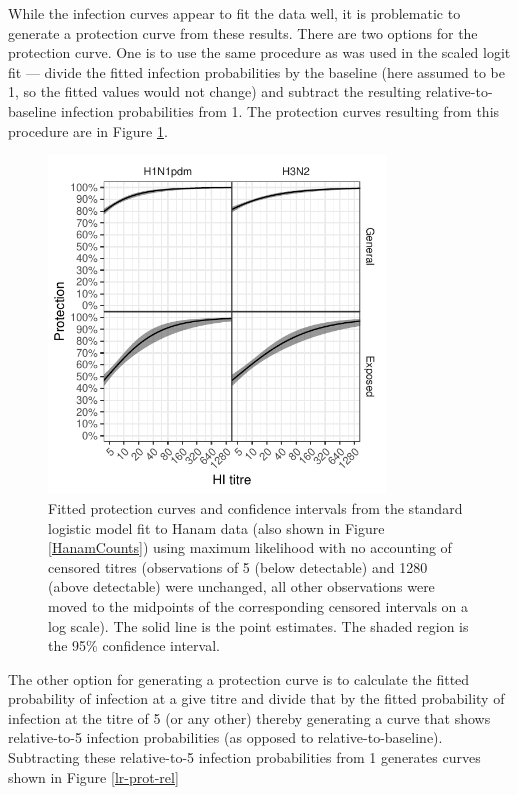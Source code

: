 \documentclass[12pt]{article}
\begin{document}
\pagebreak

While the infection curves appear to fit the data well, it is problematic to generate a protection curve from these results. There are two options for the protection curve. One is to use the same procedure as was used in the scaled logit fit --- divide the fitted infection probabilities by the baseline (here assumed to be 1, so the fitted values would not change) and subtract the resulting relative-to-baseline infection probabilities from 1. The protection curves resulting from this procedure are in Figure \ref{lr-prot-abs}.

\begin{figure}[htp]
	\centering
	\includegraphics[width=0.8\textwidth]{../fit-logistic-plot/hanam-hi-prot.pdf}
	\caption{
	Fitted protection curves and confidence intervals from the standard logistic model fit to Hanam data (also shown in Figure \ref{HanamCounts}) using maximum likelihood with no accounting of censored titres (observations of 5 (below detectable) and 1280 (above detectable) were unchanged, all other observations were moved to the midpoints of the corresponding censored intervals on a log scale). The solid line is the point estimates. The shaded region is the 95\% confidence interval.
	}
	\label{lr-prot-abs}
\end{figure}

The other option for generating a protection curve is to calculate the fitted probability of infection at a give titre and divide that by the fitted probability of infection at the titre of 5 (or any other) thereby generating a curve that shows relative-to-5 infection probabilities (as opposed to relative-to-baseline). Subtracting these relative-to-5 infection probabilities from 1 generates curves shown in Figure \ref{lr-prot-rel}
\end{document}
